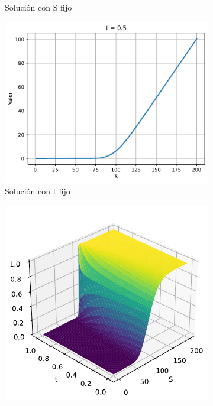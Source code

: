 \begin{figure}[H]
\begin{subfigure}[b]{0.3\linewidth}
        \caption{Solución con S fijo}
    \end{subfigure}
    \begin{subfigure}[b]{0.3\linewidth}
        \includegraphics[width=\linewidth]{Imagenes/Parte1/6_Sols/Call/CalltFIjo.pdf}
        \caption{Solución con t fijo}
    \end{subfigure}
    \begin{subfigure}[b]{0.3\linewidth}
        \includegraphics[width=\linewidth]{Imagenes/Parte1/6_Sols/Call/Call_Delta.pdf}

\end{subfigure}
\end{figure}

